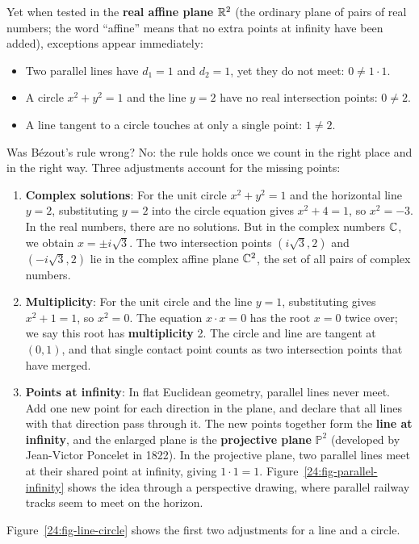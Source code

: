 Yet when tested in the \textbf{real affine plane} $\mathbb{R}^2$ (the ordinary plane of pairs of real numbers; the word ``affine'' means that no extra points at infinity have been added), exceptions appear immediately:
\begin{itemize}
\item Two parallel lines have $d_1 = 1$ and $d_2 = 1$, yet they do not meet: $0 \neq 1 \cdot 1$.
\item A circle $x^2 + y^2 = 1$ and the line $y = 2$ have no real intersection points: $0 \neq 2$.
\item A line tangent to a circle touches at only a single point: $1 \neq 2$.
\end{itemize}
Was B\'ezout's rule wrong? No: the rule holds once we count in the right place and in the right way. Three adjustments account for the missing points:
\begin{enumerate}
\item \textbf{Complex solutions}: For the unit circle $x^2 + y^2 = 1$ and the horizontal line $y = 2$, substituting $y = 2$ into the circle equation gives $x^2 + 4 = 1$, so $x^2 = -3$. In the real numbers, there are no solutions. But in the complex numbers $\mathbb{C}$, we obtain $x = \pm i\sqrt{3}$. The two intersection points $(i\sqrt{3}, 2)$ and $(-i\sqrt{3}, 2)$ lie in the complex affine plane $\mathbb{C}^2$, the set of all pairs of complex numbers.
\item \textbf{Multiplicity}: For the unit circle and the line $y = 1$, substituting gives $x^2 + 1 = 1$, so $x^2 = 0$. The equation $x \cdot x = 0$ has the root $x = 0$ twice over; we say this root has \textbf{multiplicity} 2. The circle and line are tangent at $(0, 1)$, and that single contact point counts as two intersection points that have merged.
\item \textbf{Points at infinity}: In flat Euclidean geometry, parallel lines never meet. Add one new point for each direction in the plane, and declare that all lines with that direction pass through it. The new points together form the \textbf{line at infinity}, and the enlarged plane is the \textbf{projective plane} $\mathbb{P}^2$ (developed by Jean-Victor Poncelet in 1822). In the projective plane, two parallel lines meet at their shared point at infinity, giving $1 \cdot 1 = 1$. Figure~\ref{24:fig-parallel-infinity} shows the idea through a perspective drawing, where parallel railway tracks seem to meet on the horizon.
\end{enumerate}

Figure~\ref{24:fig-line-circle} shows the first two adjustments for a line and a circle.

